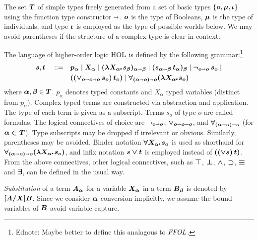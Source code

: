 \begin{definition}\label{holtypes}
  The set $\boldsymbol{T}$ of simple types freely generated from a set of
  basic types $\{\boldsymbol{o}, \boldsymbol{\mu}, \boldsymbol{\iota}\}$ using the function type
  constructor $\boldsymbol{\shortrightarrow}$. $\boldsymbol{o}$ is the type of Booleans,
  $\boldsymbol{\mu}$ is the type of individuals, and type
  $\boldsymbol{\iota}$ is employed as the type of possible worlds below. We
  may avoid parentheses if the structure of a complex type is clear in context.
\end{definition}

\begin{definition}\label{holgrammar}
The language of higher-order logic $\text{\textrm{HOL}}$ is defined by the following
grammar:\footnote{Ednote: Maybe better to define this analagous to $\mathit{FFOL}$.}
\begin{align*} 
  \hol{s},\hol{t} \quad ::= \quad & \hol{p_\alpha} \mid \hol{X_\alpha} \mid \hol{(\lam{X_\alpha}
  s_\beta)_{\alpha\ar\beta}} \mid \hol{(s_{\alpha\ar\beta}\, t_\alpha)_\beta} \mid  \hol{\neg_{o\ar o}\, s_o} \mid \\
  & \hol{(({\vee_{o\ar o\ar o}}\,s_o)\,t_o)} \mid \hol{\forall_{(\alpha\ar
    o)\ar o}(\lam{X_\alpha} s_o)} 
\end{align*}
where $\boldsymbol{\alpha},\boldsymbol{\beta}\in \boldsymbol{T}$. $p_\alpha$ denotes typed constants and
$X_\alpha$ typed variables (distinct from $p_\alpha$).  Complex typed
terms are constructed via abstraction and application. The type of
each term is given as a subscript.  Terms $s_o$ of type $o$ are called
formulas.  The logical connectives of choice are
$\boldsymbol{\neg_{o\shortrightarrow o}}$, $\boldsymbol{\vee_{o\shortrightarrow
  o\shortrightarrow o}}$, and $\boldsymbol{\forall_{(\alpha\shortrightarrow
  o)\shortrightarrow o}}$ (for $\boldsymbol{\alpha\in T}$).  Type subscripts may be dropped if
irrelevant or obvious. Similarly, parentheses may be avoided.  Binder
notation $\hol{\all{X_\alpha} s_o}$ is used as shorthand for
$\hol{\forall_{(\alpha\ar o)\ar o}
(\lam{X_\alpha} s_o)}$, and infix notation $\boldsymbol{s \vee t}$ is employed
instead of $\boldsymbol{((\vee s)\, t)}$. From the above connectives, other logical
connectives, such as $\boldsymbol{\top}$, $\boldsymbol{\bot}$, $\boldsymbol{\wedge}$,
$\boldsymbol{\supset}$, $\boldsymbol{\equiv}$ and $\boldsymbol{\exists}$, can be defined in the usual way.
\end{definition}


  \emph{Substitution} of a term $\boldsymbol{A_\alpha}$ for a variable $\boldsymbol{X_\alpha}$
  in a term $\boldsymbol{B_\beta}$ is denoted by $\boldsymbol{[A/X]B}$.  Since we consider
  $\boldsymbol{\alpha}$-conversion implicitly, we assume the bound variables of $\boldsymbol{B}$
  avoid variable capture.


